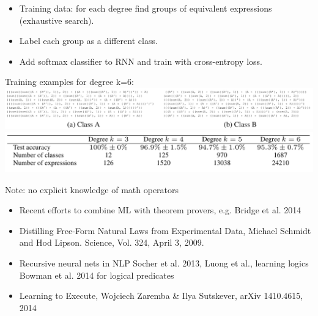 \documentclass[landscape,a0b]{a0poster_csml_v2}
\begin{document}
\begin{poster}
\begin{PosterColumn}
\begin{itemize}
  \item Training data: for each degree find groups of equivalent expressions (exhaustive search).
  \item Label each group as a different class.
  \item Add softmax classifier to RNN and train with cross-entropy loss.
\end{itemize}

Training examples for degree k=6:\\
\includegraphics[width=0.98\linewidth]{imgs/classes.png}
\includegraphics[width=0.98\linewidth]{imgs/print_trees.png}
\vspace{-0.5cm}
\begin{center}
Note: no explicit knowledge of math operators
\end{center}
\vspace{-0.5cm}
\vspace{-0.8cm}
\begin{itemize}
  \item Recent efforts to combine ML with theorem provers, e.g. Bridge et al. 2014
  \item Distilling Free-Form Natural Laws from Experimental Data, Michael Schmidt and Hod Lipson.  Science, Vol. 324, April 3, 2009.
  \item Recursive neural nets in NLP Socher et al. 2013, Luong et al., learning logics Bowman et al. 2014 for logical predicates
  \item Learning to Execute, Wojciech Zaremba \& Ilya Sutskever, arXiv 1410.4615, 2014
\end{itemize}
\end{PosterColumn}

\end{poster}
\end{document}
